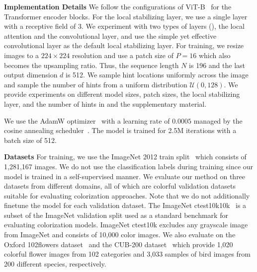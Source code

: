 \documentclass[10pt,twocolumn,letterpaper]{article}
\begin{document}
\noindent \textbf{Implementation Details} 
We follow the configurations of ViT-B~\cite{vit} for the Transformer encoder blocks. 
For the local stabilizing layer, we use a single layer with a receptive field of 3. 
We experiment with two types of layers (), the local attention and the convolutional layer, and use the simple yet effective convolutional layer as the default local stabilizing layer. 
For training, we resize images to a $224\times 224$ resolution and use a patch size of $P=16$ which also becomes the upsampling ratio. 
Thus, the sequence length $N$ is 196 and the last output dimension $d$ is 512. 
We sample hint locations uniformly across the image and sample the number of hints from a uniform distribution $\mathcal{U}(0, 128)$. 
We provide experiments on different model sizes, patch sizes, the local stabilizing layer, and the number of hints in  and the supplementary material. 

We use the AdamW optimizer~\cite{adamw} with a learning rate of $0.0005$ managed by the cosine annealing scheduler~\cite{coslr}. 
The model is trained for 2.5M iterations with a batch size of 512. 

\vspace{+0.1cm}
\noindent \textbf{Datasets}
For training, we use the ImageNet 2012 train split~\cite{imagenet} which consists of 1,281,167 images. 
We do not use the classification labels during training since our model is trained in a self-supervised manner. 
We evaluate our method on three datasets from different domains, all of which are colorful validation datasets suitable for evaluating colorization approaches. 
Note that we do not additionally finetune the model for each validation dataset. 
The ImageNet ctest10k10k~\cite{ctest} is a subset of the ImageNet validation split used as a standard benchmark for evaluating colorization models. 
ImageNet ctest10k excludes any grayscale image from ImageNet and consists of 10,000 color images. 
We also evaluate on the Oxford 102flowers dataset~\cite{flowers} and the CUB-200 dataset~\cite{cub} which provide 1,020 colorful flower images from 102 categories and 3,033 samples of bird images from 200 different species, respectively. 
\end{document}
